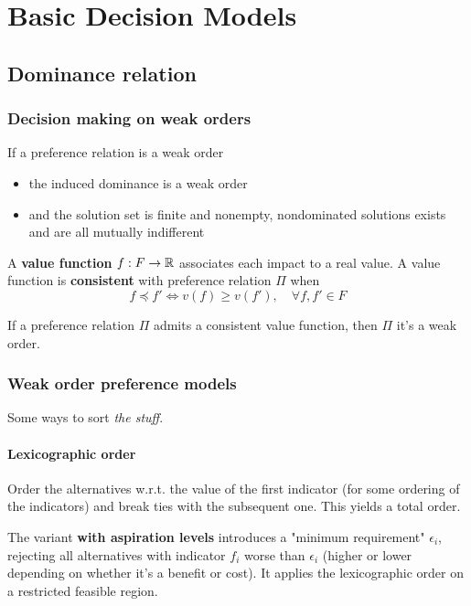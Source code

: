\section{Basic Decision Models}

\subsection{Dominance relation}

\subsubsection{Decision making on weak orders}

If a preference relation is a weak order
\begin{itemize}
	\item the induced dominance is a weak order
	
	\item and the solution set is finite and nonempty, nondominated solutions exists and are all mutually indifferent
\end{itemize}

A \textbf{value function} $f: F \rightarrow \operatorname{\mathbb{R}}$ associates each impact to a real value. A value function is \textbf{consistent} with preference relation $\Pi$ when 
$$ f \preceq f' \Leftrightarrow v(f) \geq v(f'), \quad \forall f,f' \in F$$

If a preference relation $\Pi$ admits a consistent value function, then $\Pi$ it's a weak order.

\subsubsection{Weak order preference models}

Some ways to sort \textit{the stuff}.

\paragraph{Lexicographic order} Order the alternatives w.r.t. the value of the first indicator (for some ordering of the indicators) and break ties with the subsequent one. This yields a total order.

The variant \textbf{with aspiration levels} introduces a "minimum requirement" $\epsilon_i$, rejecting all alternatives with indicator $f_i$ worse than $\epsilon_i$ (higher or lower depending on whether it's a benefit or cost). It applies the lexicographic order on a restricted feasible region.

